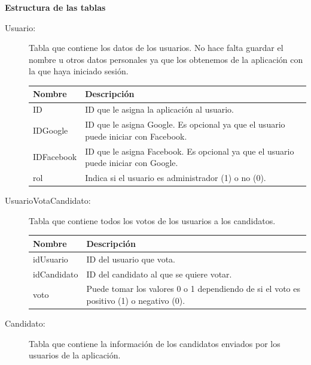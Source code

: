 \newpage
\textbf{Estructura de las tablas}
\begin{description}
\item[Usuario:] Tabla que contiene los datos de los usuarios. No hace falta guardar el nombre u otros datos personales ya que los obtenemos de la aplicación con la que haya iniciado sesión.

\begin{tabularx}{14cm}{|l|X|}
\hline
\textbf{Nombre} & \textbf{Descripción}                                                              \\ \hline
ID              & ID que le asigna la aplicación al usuario.                                         \\ \hline
IDGoogle        & ID que le asigna Google. Es opcional ya que el usuario puede iniciar con Facebook. \\ \hline
IDFacebook      & ID que le asigna Facebook. Es opcional ya que el usuario puede iniciar con Google. \\ \hline
rol      & Indica si el usuario es administrador (1) o no (0). \\ \hline
\end{tabularx}

\item[UsuarioVotaCandidato:] Tabla que contiene todos los votos de los usuarios a los candidatos.

\begin{tabularx}{14cm}{|l|X|}
\hline
\textbf{Nombre} & \textbf{Descripción}                                                              \\ \hline
idUsuario       & ID del usuario que vota.                                                           \\ \hline
idCandidato     & ID del candidato al que se quiere votar.                                           \\ \hline
voto            & Puede tomar los valores 0 o 1 dependiendo de si el voto es positivo (1) o negativo (0). \\ \hline
\end{tabularx}

\item[Candidato:] Tabla que contiene la información de los candidatos enviados por los usuarios de la aplicación.


\end{description}
